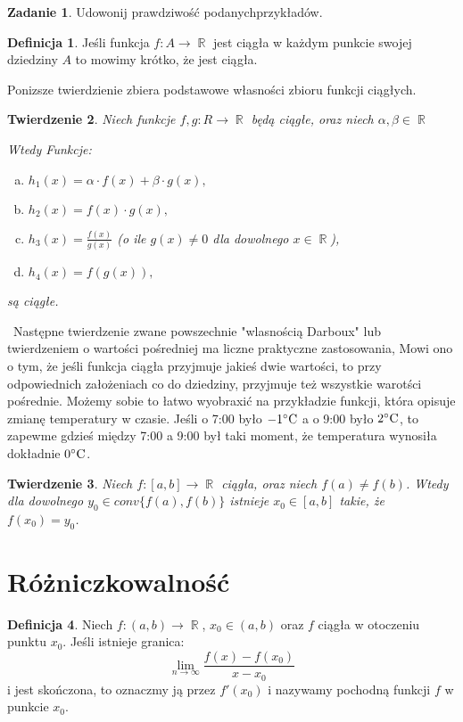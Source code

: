 \documentclass[12pt,a4paper]{article}
\newtheorem{tw}{Twierdzenie}[section]
\theoremstyle{definition}
\newtheorem{df}[tw]{Definicja}
\newtheorem{zad}{Zadanie}
\DeclareMathOperator{\R}{\mathbb{R}}
\begin{document}
\begin{zad}
Udowonij prawdziwość podanychprzykładów.
\end{zad}

\begin{df}
Jeśli funkcja $f:A\rightarrow\R$ jest ciągła w każdym punkcie swojej dziedziny $A$ to mowimy krótko, że jest ciągła.
\end{df}

\begin{flushright}
Ponizsze twierdzienie zbiera podstawowe własności zbioru funkcji ciągłych.
\end{flushright}

\begin{tw}
\textit{Niech funkcje $f,g: R\rightarrow\R$ będą ciągłe, oraz niech $\alpha,\beta\in\R$}

\textit{Wtedy Funkcje:}
\begin{enumerate}[a)]
\item $h_1(x)=\alpha\cdot f(x)+\beta\cdot g(x),$
\item $h_2(x)=f(x)\cdot g(x),$
\item $h_3(x)=\frac{f(x)}{g(x)}$ \textit{(o ile $g(x)\neq 0$ dla dowolnego $x\in\R$),}
\item $h_4(x)=f(g(x)),$
\end{enumerate}
\textit{są ciągłe.}

\end{tw}

\	Następne twierdzenie zwane powszechnie "wlasnością Darboux" lub twierdzeniem o wartości pośredniej ma liczne praktyczne zastosowania, Mowi ono o tym,
że jeśli funkcja ciągła przyjmuje jakieś dwie wartości, to przy odpowiednich założeniach co do dziedziny, przyjmuje też wszystkie warotści pośrednie.
Możemy sobie to łatwo wyobraxić na przykładzie funkcji, która opisuje  zmianę temperatury w czasie. Jeśli o 7:00 było $-1\celsius$ a o 9:00 było $2\celsius$,
to zapewme gdzieś między 7:00 a 9:00 był taki moment, że temperatura wynosiła dokładnie $0\celsius$.

\begin{tw}
\textit{Niech $f:[a,b]\rightarrow\R$ ciągła, oraz niech $f(a)\neq f(b)$.
Wtedy dla dowolnego $y_0\in conv\{f(a),f(b)\}$ istnieje $x_0\in [a,b]$ takie, że $f(x_0)=y_0$.}
\end{tw}

\section{Różniczkowalność}
\begin{df}
Niech $f:(a,b)\rightarrow\R$, $x_0\in (a,b)$ oraz $f$ ciągła w otoczeniu punktu $x_0$. Jeśli istnieje granica:
\begin{displaymath}
\lim_{n \to \infty}
\frac{f(x)-f(x_0)}{x-x_0}
\end{displaymath}
i jest skończona, to oznaczmy ją przez $f'(x_0)$ i nazywamy pochodną funkcji $f$ w punkcie $x_0$.
\end{df}
\end{document}
